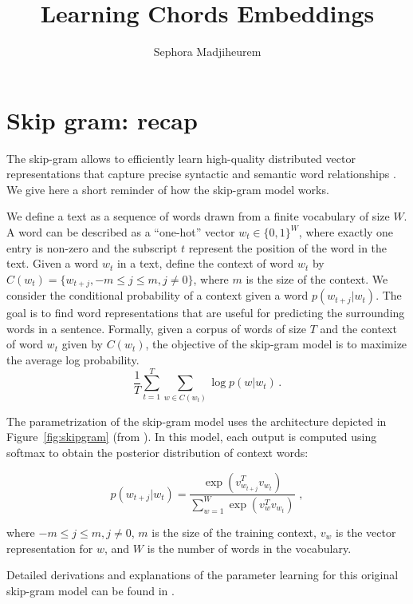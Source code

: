 \documentclass[12pt]{article}\pagestyle{myheadings}
\title{Learning Chords Embeddings}
\author{Sephora Madjiheurem}
\begin{document}
\maketitle

\section{Skip gram: recap}

The skip-gram allows to efficiently learn high-quality distributed vector representations that capture precise syntactic and semantic word relationships \citep{mik2013}. We give here a short reminder of how the skip-gram model works.

We define a text as a sequence of words drawn from a finite vocabulary of size $W$. A word can be described as a ``one-hot'' vector $w_t \in \{0,1\}^W$, where exactly one entry is non-zero and the subscript $t$ represent the position of the word in the text.  
Given a  word $w_t$ in a text, define the context of word $w_t$ by $ C(w_t) = \{w_{t+j}, -m \leq j \leq m , j \neq 0\}$, where $m$ is the size of the context. We consider the conditional probability of a context given a word  $p(w_{t+j}|w_t)$.  The goal is to find word representations that are useful for predicting the surrounding words in a sentence. Formally, given a corpus of words of size $T$ and the context of word $w_t$ given by $C(w_t)$, the objective of the skip-gram model is to maximize the average log probability. 
\begin{equation}
\frac{1}{T} \sum_{t=1}^T \sum_{w \in C(w_t)} \log p(w|w_t)\,.
\label{eq:skipgram_obj}
\end{equation}

The parametrization of the skip-gram model uses the architecture depicted in Figure~\ref{fig:skipgram} (from \citet{mik2013}). In this model, each output is computed using softmax to obtain the posterior distribution of context words:

\begin{equation}
p(w_{t+j}|w_t) = \frac{ \exp (v_{w_{t+j}}^T v_{w_t})}{\sum_{w=1}^W \exp (v_{w}^T v_{w_t})} \,\,,
\end{equation}

where $-m \leq j \leq m, j\neq 0$, $m$ is the size of the training context,  $v_w$ is the vector representation for $w$, and $W$ is the number of words in the vocabulary.

Detailed derivations and explanations of the parameter learning for this original skip-gram model can be found in \citep{Rong14}.
\end{document}
